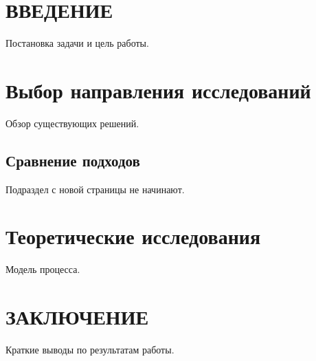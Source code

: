 

\section*{ВВЕДЕНИЕ}

Постановка задачи и цель работы.

\section{Выбор направления исследований} %

Обзор существующих решений.

\subsection{Сравнение подходов}

Подраздел с новой страницы не начинают.

\newpage
\section{Теоретические исследования}

Модель процесса.

\section*{ЗАКЛЮЧЕНИЕ} %

Краткие выводы по результатам работы.


